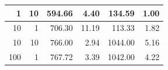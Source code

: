 \documentclass[12pt,a4paper,twoside,openright]{report}
\begin{document}
\begin{table}[H]
\begin{tabular}{|r|r|r|r|r|r|}
1                                                                                                & 10                                                                                                                         & 594.66                                                                                                                                          & 4.40                                                                                                                             & 134.59                                                                                                   & 1.00                                                                                                                             \\ \hline
10                                                                                               & 1                                                                                                                          & 706.30                                                                                                                                          & 11.19                                                                                                                            & 113.33                                                                                                   & 1.82                                                                                                                             \\ \hline
10                                                                                               & 10                                                                                                                         & 766.00                                                                                                                                          & 2.94                                                                                                                             & 1044.00                                                                                                  & 5.16                                                                                                                             \\ \hline
100                                                                                              & 1                                                                                                                          & 767.72                                                                                                                                          & 3.39                                                                                                                             & 1042.00                                                                                                  & 4.22                                                                                                                             \\ \hline

\end{tabular}
\end{table}
\end{document}
